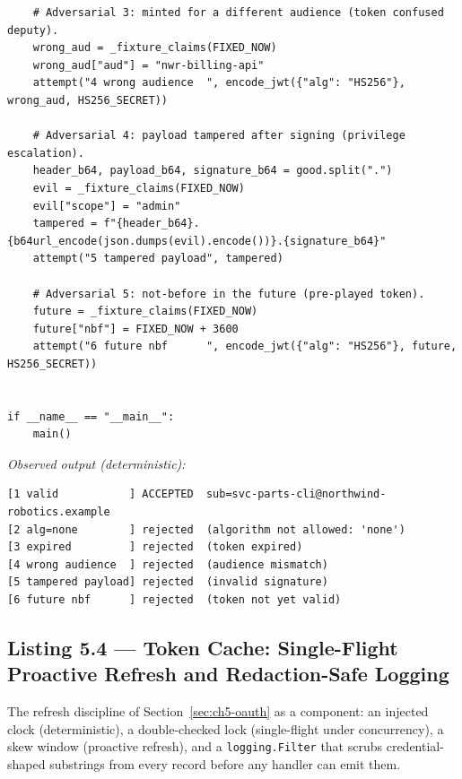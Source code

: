 \begin{verbatim}
    # Adversarial 3: minted for a different audience (token confused deputy).
    wrong_aud = _fixture_claims(FIXED_NOW)
    wrong_aud["aud"] = "nwr-billing-api"
    attempt("4 wrong audience  ", encode_jwt({"alg": "HS256"}, wrong_aud, HS256_SECRET))

    # Adversarial 4: payload tampered after signing (privilege escalation).
    header_b64, payload_b64, signature_b64 = good.split(".")
    evil = _fixture_claims(FIXED_NOW)
    evil["scope"] = "admin"
    tampered = f"{header_b64}.{b64url_encode(json.dumps(evil).encode())}.{signature_b64}"
    attempt("5 tampered payload", tampered)

    # Adversarial 5: not-before in the future (pre-played token).
    future = _fixture_claims(FIXED_NOW)
    future["nbf"] = FIXED_NOW + 3600
    attempt("6 future nbf      ", encode_jwt({"alg": "HS256"}, future, HS256_SECRET))


if __name__ == "__main__":
    main()
\end{verbatim}
\noindent\emph{Observed output (deterministic):}
\begin{verbatim}
[1 valid           ] ACCEPTED  sub=svc-parts-cli@northwind-robotics.example
[2 alg=none        ] rejected  (algorithm not allowed: 'none')
[3 expired         ] rejected  (token expired)
[4 wrong audience  ] rejected  (audience mismatch)
[5 tampered payload] rejected  (invalid signature)
[6 future nbf      ] rejected  (token not yet valid)
\end{verbatim}

\subsection{Listing 5.4 --- Token Cache: Single-Flight Proactive Refresh and Redaction-Safe Logging}
\label{lst:tokencache}

The refresh discipline of Section~\ref{sec:ch5-oauth} as a component: an
injected clock (deterministic), a double-checked lock (single-flight under
concurrency), a skew window (proactive refresh), and a
\texttt{logging.Filter} that scrubs credential-shaped substrings from every
record before any handler can emit them.


